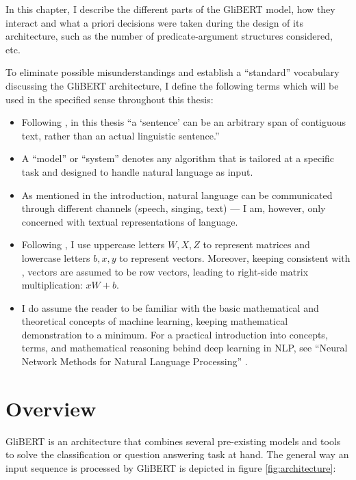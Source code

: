 
\label{chap:4_architecture}

In this chapter, I describe the different parts of the GliBERT model, how they interact and
what a priori decisions were taken during the design of its architecture, such as the number
of predicate-argument structures considered, etc.

To eliminate possible misunderstandings and establish a ``standard'' vocabulary discussing the GliBERT
architecture, I define the following terms which will be used in the specified sense throughout
this thesis:

\begin{itemize}
  \item Following \cite{devlin2018bert}, in this thesis ``a `sentence' can be an arbitrary span of contiguous text, rather
    than an actual linguistic sentence.''
  \item A ``model'' or ``system'' denotes any algorithm that is tailored at a specific task and designed
    to handle natural language as input.
  \item As mentioned in the introduction, natural language can be communicated through different channels (speech, singing, text)
    --- I am, however, only concerned with textual representations of language.
  \item Following \cite{goldberg2017neural}, I use uppercase letters $W, X, Z$ to represent matrices and lowercase
    letters $b, x, y$ to represent vectors. Moreover, keeping consistent with \citeauthor{goldberg2017neural},
    vectors are assumed to be row vectors, leading to right-side matrix multiplication: $xW + b$.
  \item I do assume the reader to be familiar with the basic mathematical and theoretical concepts of machine learning,
    keeping mathematical demonstration to a minimum. For a practical introduction into concepts, terms, and mathematical
    reasoning behind deep learning in NLP, see ``Neural Network Methods for Natural Language Processing'' \citep{goldberg2017neural}.
\end{itemize}



\section{Overview}

GliBERT is an architecture that combines several pre-existing models and
tools to solve the classification or question answering task at hand. The
general way an input sequence is processed by GliBERT is depicted in figure
\ref{fig:architecture}:


